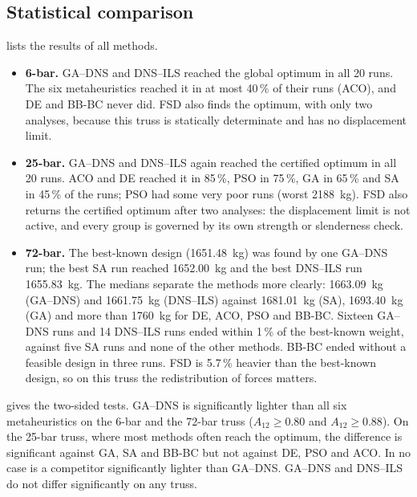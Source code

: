 \documentclass[lineno,pdflatex,sn-mathphys-num]{sn-jnl}
\begin{document}
\subsection{Statistical comparison}
\label{sec:res-stats}
 lists the results of all methods.
\begin{itemize}
\item \textbf{6-bar.} GA--DNS and DNS--ILS reached the global optimum in all
      20 runs. The six metaheuristics reached it in at most 40\,\% of their
      runs (ACO), and DE and BB-BC never did. FSD also finds the optimum, with
      only two analyses, because this truss is statically determinate and has
      no displacement limit.
\item \textbf{25-bar.} GA--DNS and DNS--ILS again reached the certified
      optimum in all 20 runs. ACO and DE reached it in 85\,\%, PSO in 75\,\%,
      GA in 65\,\% and SA in 45\,\% of the runs; PSO had some very poor runs
      (worst 2188~kg). FSD also returns the certified optimum after two
      analyses: the displacement limit is not active, and every group is
      governed by its own strength or slenderness check.
\item \textbf{72-bar.} The best-known design (1651.48~kg) was found by one
      GA--DNS run; the best SA run reached 1652.00~kg and the best DNS--ILS run
      1655.83~kg. The medians separate the methods more clearly: 1663.09~kg
      (GA--DNS) and 1661.75~kg (DNS--ILS) against 1681.01~kg (SA), 1693.40~kg
      (GA) and more than 1760~kg for DE, ACO, PSO and BB-BC. Sixteen GA--DNS
      runs and 14 DNS--ILS runs ended within 1\,\% of the best-known weight,
      against five SA runs and none of the other methods. BB-BC ended
      without a feasible design in three runs. FSD is 5.7\,\% heavier than the
      best-known design, so on this truss the redistribution of forces matters.
\end{itemize}



 gives the two-sided tests. GA--DNS is significantly lighter
than all six metaheuristics on the 6-bar and the 72-bar truss
($A_{12}\ge0.80$ and $A_{12}\ge0.88$). On the 25-bar truss, where most methods
often reach the optimum, the difference is significant against GA, SA and
BB-BC but not against DE, PSO and ACO. In no case is a competitor
significantly lighter than GA--DNS. GA--DNS and DNS--ILS do not differ
significantly on any truss.


\end{document}
